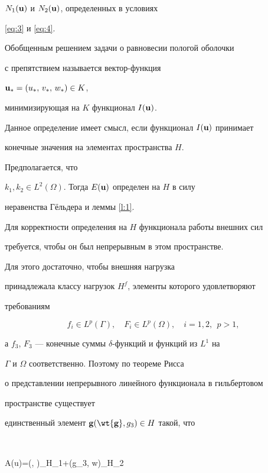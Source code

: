 $N_1({\bold u})$ и $N_2({\bold u})$, определенных в условиях


\eqref{eq:3} и \eqref{eq:4}.





\begin{defnnonum}


Обобщенным решением задачи о равновесии пологой оболочки


с препятствием называется вектор-функция


${\bold u_*}=(u_*,\,v_*,\,w_*)\in K$,


минимизирующая на $K$ функционал $I({\bold u})$.


\end{defnnonum}





Данное определение имеет смысл, если функционал $I({\bold u})$ принимает


конечные значения на элементах пространства $H$.


Предполагается, что


$k_1,k_2\in L^2(\Omega)$. Тогда $E({\bold u})$ определен на $H$ в силу


неравенства Г\"ельдера и леммы \ref{l:1}.


Для корректности определения на $H$ функционала работы внешних сил


требуется, чтобы он был непрерывным в этом пространстве.


Для этого достаточно, чтобы внешняя нагрузка


принадлежала классу нагрузок $H^f$, элементы которого удовлетворяют


требованиям


$$


f_i \in L^p(\Gamma),\quad F_i \in L^p(\Omega),\quad i=1,2,\ \ p > 1,


$$


а $f_3$, $F_3$ --- конечные суммы $\delta$-функций и функций из $L^1$ на


$\Gamma$ и $\Omega$ соответственно. Поэтому по теореме Рисса


о представлении непрерывного линейного функционала в гильбертовом


пространстве существует


единственный элемент ${\bold g}(\wt{\bold g}, g_3)\in H$ такой, что


$$


A({\bold u})=(, )_{H_1}+(g_3, w)_{H_2}


